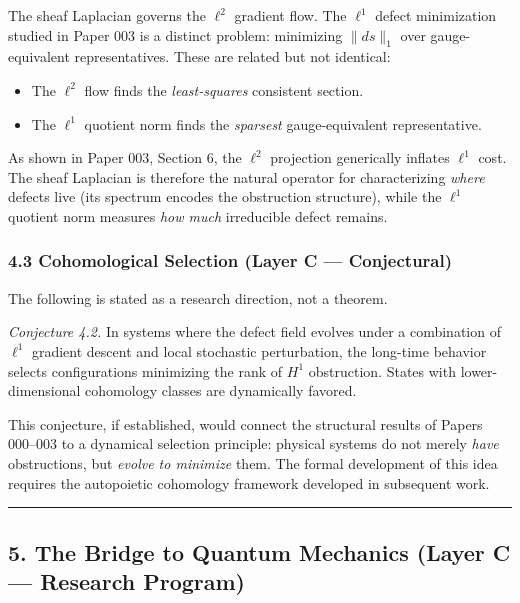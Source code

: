 \documentclass[
]{article}
\providecommand{\tightlist}{%
  \setlength{\itemsep}{0pt}\setlength{\parskip}{0pt}}
\begin{document}
The sheaf Laplacian governs the \(\ell^2\) gradient flow. The \(\ell^1\)
defect minimization studied in Paper 003 is a distinct problem:
minimizing \(\|ds\|_1\) over gauge-equivalent representatives. These are
related but not identical:

\begin{itemize}
\tightlist
\item
  The \(\ell^2\) flow finds the \emph{least-squares} consistent section.
\item
  The \(\ell^1\) quotient norm finds the \emph{sparsest}
  gauge-equivalent representative.
\end{itemize}

As shown in Paper 003, Section 6, the \(\ell^2\) projection generically
inflates \(\ell^1\) cost. The sheaf Laplacian is therefore the natural
operator for characterizing \emph{where} defects live (its spectrum
encodes the obstruction structure), while the \(\ell^1\) quotient norm
measures \emph{how much} irreducible defect remains.

\subsubsection{4.3 Cohomological Selection (Layer C ---
Conjectural)}\label{cohomological-selection-layer-c-conjectural}

The following is stated as a research direction, not a theorem.

\emph{Conjecture 4.2.} In systems where the defect field evolves under a
combination of \(\ell^1\) gradient descent and local stochastic
perturbation, the long-time behavior selects configurations minimizing
the rank of \(H^1\) obstruction. States with lower-dimensional
cohomology classes are dynamically favored.

This conjecture, if established, would connect the structural results of
Papers 000--003 to a dynamical selection principle: physical systems do
not merely \emph{have} obstructions, but \emph{evolve to minimize} them.
The formal development of this idea requires the autopoietic cohomology
framework developed in subsequent work.

\begin{center}\rule{0.5\linewidth}{0.5pt}\end{center}

\subsection{5. The Bridge to Quantum Mechanics (Layer C --- Research
Program)}\label{the-bridge-to-quantum-mechanics-layer-c-research-program}
\end{document}
